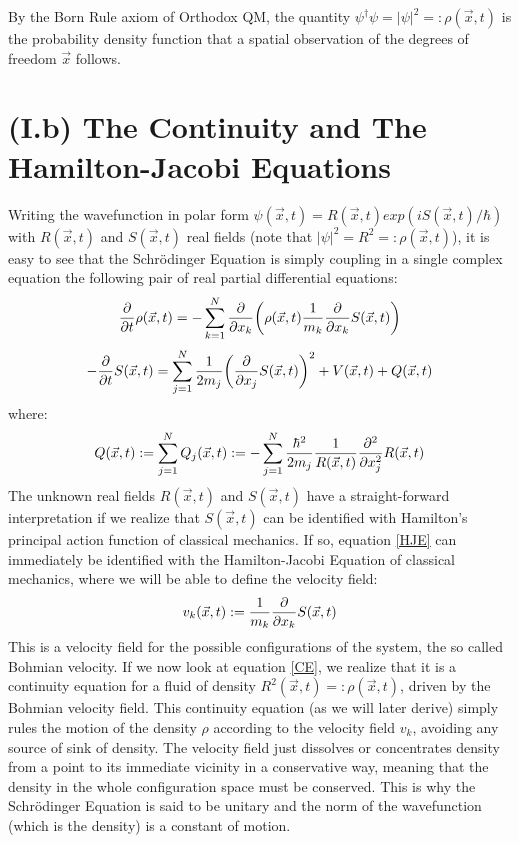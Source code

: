 \documentclass[11pt, a4paper]{article} %
\begin{document}
By the Born Rule axiom of Orthodox QM, the quantity $\psi^\dagger\psi=|\psi|^2=:\rho(\vec{x},t)$ is the probability density function that a spatial observation of the degrees of freedom $\vec{x}$ follows.

\section*{(I.b) The Continuity and The Hamilton-Jacobi Equations}
Writing the wavefunction in polar form $\psi(\vec{x},t)=R(\vec{x},t)exp(iS(\vec{x},t)/\hbar)$ with $R(\vec{x},t)$ and $S(\vec{x},t)$ real fields (note that $|\psi|^2=R^2=:\rho(\vec{x},t)$), it is easy to see that the Schrödinger Equation is simply coupling in a single complex equation the following pair of real partial differential equations:
\begin{equation}\label{CE}
\pdv{}{t} \rho(\vec{x},t)=-\sum_{k=1}^N \pdv{}{x_k}\qty( \rho(\vec{x},t)\frac{1}{m_k}\pdv{}{x_k} S(\vec{x},t) )
\end{equation}
\begin{equation}\label{HJE}
-\pdv{}{t}S(\vec{x},t) = \sum_{j=1}^N \frac{1}{2m_j} \qty(\pdv{}{x_j} S(\vec{x},t) )^2+ V(\vec{x},t)+Q(\vec{x},t)
\end{equation}
where:
\begin{equation}\label{QP}
Q(\vec{x},t):=\sum_{j=1}^N Q_j(\vec{x},t):=-\sum_{j=1}^N \frac{\hbar^2}{2m_j}\frac{1}{R(\vec{x},t)}\pdv[2]{}{x_j} R(\vec{x},t)
\end{equation}
The unknown real fields $R(\vec{x},t)$ and $S(\vec{x},t)$ have a straight-forward interpretation if we realize that $S(\vec{x},t)$ can be identified with Hamilton's principal action function of classical mechanics. If so, equation \eqref{HJE} can immediately be identified with the Hamilton-Jacobi Equation of classical mechanics, where we will be able to define the velocity field:%
\begin{equation}
v_k(\vec{x},t):=\frac{1}{m_k}\pdv{}{x_k}S(\vec{x},t)
\end{equation}
This is a velocity field for the possible configurations of the system, the so called Bohmian velocity. If we now look at equation \eqref{CE}, we realize that it is a continuity equation for a fluid of density $R^2(\vec{x},t)=:\rho(\vec{x},t)$, driven by the Bohmian velocity field. This continuity equation (as we will later derive) simply rules the motion of the density $\rho$ according to the velocity field $v_k$, avoiding any source of sink of density. The velocity field just dissolves or concentrates density from a point to its immediate vicinity in a conservative way, meaning that the density in the whole configuration space must be conserved. This is why the Schrödinger Equation is said to be unitary and the norm of the wavefunction (which is the density) is a constant of motion.
\end{document}
